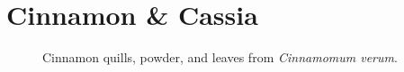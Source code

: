 


\section{Cinnamon \& Cassia}
\label{sec:cinnamon}
\label{sec:cassia}



\begin{figure}[!ht]
	\vspace{-4ex}
	\centering
	\hfill
	\hfill
	\caption{Cinnamon quills, powder, and leaves from \textit{Cinnamomum verum}.}
	\label{fig:cinnamon_imgs}
\end{figure}

